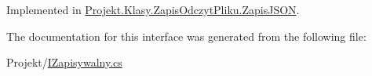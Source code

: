 Implemented in \mbox{\hyperlink{class_projekt_1_1_klasy_1_1_zapis_odczyt_pliku_1_1_zapis_j_s_o_n_a8a947e364a71755f2a00b0d7c8236cee}{Projekt.\+Klasy.\+Zapis\+Odczyt\+Pliku.\+Zapis\+J\+S\+ON}}.



The documentation for this interface was generated from the following file\+:\begin{DoxyCompactItemize}
\item 
Projekt/\mbox{\hyperlink{_i_zapisywalny_8cs}{I\+Zapisywalny.\+cs}}\end{DoxyCompactItemize}
